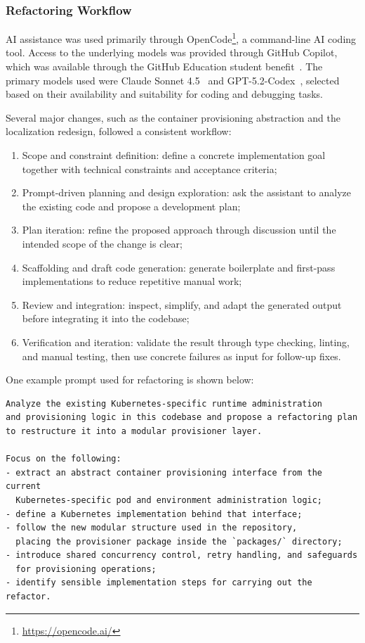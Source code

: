 \subsubsection{Refactoring Workflow} \label{subsubsec:refactoring-workflow}
AI assistance was used primarily through OpenCode\footnote{\url{https://opencode.ai/}}, a command-line AI coding tool.
Access to the underlying models was provided through GitHub Copilot, which was available through the GitHub Education student benefit~\cite{github_copilot_supported_models,github_education_students}.
The primary models used were Claude Sonnet 4.5~\cite{anthropic_claude_sonnet_4_5_2025} and GPT-5.2-Codex~\cite{openai_gpt_5_2_codex_2025}, selected based on their availability and suitability for coding and debugging tasks.

Several major changes, such as the container provisioning abstraction and the localization redesign, followed a consistent workflow:

\begin{enumerate}
  \item Scope and constraint definition: define a concrete implementation goal together with technical constraints and acceptance criteria;
  \item Prompt-driven planning and design exploration: ask the assistant to analyze the existing code and propose a development plan;
  \item Plan iteration: refine the proposed approach through discussion until the intended scope of the change is clear;
  \item Scaffolding and draft code generation: generate boilerplate and first-pass implementations to reduce repetitive manual work;
  \item Review and integration: inspect, simplify, and adapt the generated output before integrating it into the codebase;
  \item Verification and iteration: validate the result through type checking, linting, and manual testing, then use concrete failures as input for follow-up fixes.
\end{enumerate}

One example prompt used for refactoring is shown below:

\begin{verbatim}
Analyze the existing Kubernetes-specific runtime administration
and provisioning logic in this codebase and propose a refactoring plan
to restructure it into a modular provisioner layer.

Focus on the following:
- extract an abstract container provisioning interface from the current
  Kubernetes-specific pod and environment administration logic;
- define a Kubernetes implementation behind that interface;
- follow the new modular structure used in the repository,
  placing the provisioner package inside the `packages/` directory;
- introduce shared concurrency control, retry handling, and safeguards
  for provisioning operations;
- identify sensible implementation steps for carrying out the refactor.
\end{verbatim}

